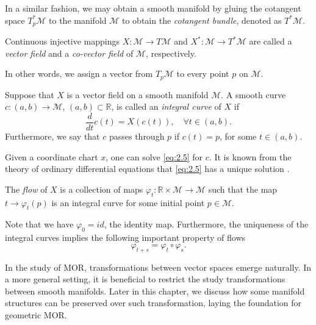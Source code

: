 In a similar fashion, we may obtain a smooth manifold by gluing the cotangent space $T^*_p \mathcal M$ to the manifold $\mathcal M$ to obtain the \emph{cotangent bundle}, denoted as $T^* \mathcal M$. 

\begin{definition}
Continuous injective mappings $X:\mathcal M \to T \mathcal M$ and $X^*:\mathcal M \to T^* \mathcal M$ are called a \emph{vector field} and a \emph{co-vector field} of $\mathcal M$, respectively.
\end{definition}
In other words, we assign a vector from $T_p\mathcal M$ to every point $p$ on $\mathcal M$.

\begin{definition}
Suppose that $X$ is a vector field on a smooth manifold $\mathcal M$. A smooth curve $c:(a,b)\to \mathcal M$, $(a,b)\subset \mathbb R$, is called an \emph{integral curve} of $X$ if
\begin{equation} \label{eq:2.5}
	\frac{d}{dt}c(t) = X(c(t)), \quad \forall t\in(a,b).
\end{equation}
Furthermore, we say that $c$ passes through $p$ if $c(t) = p$, for some $t\in(a,b)$.
\end{definition}
Given a coordinate chart $x$, one can solve \eqref{eq:2.5} for $c$. It is known from the theory of ordinary differential equations that \eqref{eq:2.5} has a unique solution \cite{teschl2012ordinary}. 
\begin{definition}
	The \emph{flow} of $X$ is a collection of maps $\varphi_t : \mathbb R \times \mathcal M \to \mathcal M$ such that the map $t \to \varphi_t(p)$ is an integral curve for some initial point $p\in \mathcal M$.
\end{definition}
Note that we have $\varphi_0 = id$, the identity map. Furthermore, the uniqueness of the integral curves implies the following important property of flows
\begin{equation} \label{eq:2.51}
	\varphi_{t+s} = \varphi_t \circ \varphi_s.
\end{equation}

In the study of MOR, transformations between vector spaces emerge naturally. In a more general setting, it is beneficial to restrict the study transformations between smooth manifolds. Later in this chapter, we discuss how some manifold structures can be preserved over such transformation, laying the foundation for geometric MOR.

